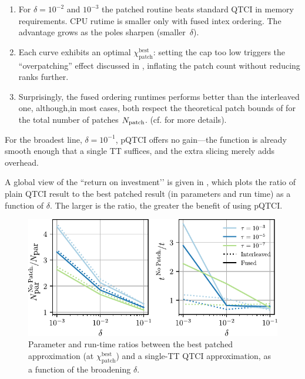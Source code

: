 \begin{enumerate}
\item For \(\delta=10^{-2}\) and \(10^{-3}\) the patched routine beats standard QTCI in memory requirements. CPU rutime is smaller only with fused intex ordering. The advantage grows as the poles sharpen (smaller~\(\delta\)).

\item Each curve exhibits an optimal
      \(\chi_{\text{patch}}^{\mathrm{best}}\): setting the cap too low triggers the ``overpatching'' effect discussed in
      , inflating the patch count without reducing ranks further.

\item Surprisingly, the fused ordering runtimes performs better than the interleaved one, although,in most cases, both respect the theoretical patch bounds of  for the total number of patches $N_{\text{patch}}$. (cf.  for more details).
\end{enumerate}

For the broadest line, \(\delta=10^{-1}\), pQTCI offers no gain—the function is already smooth enough that a single TT suffices, and the extra slicing merely adds overhead.

A global view of the “return on investment’’ is given in , which plots the ratio of plain QTCI result to the best patched result (in parameters and run time) as a function of \(\delta\).  The larger is the ratio, the greater the benefit of using pQTCI.

\begin{figure}[ht!]
    \centering
    \includegraphics{figures/localisationParam2DGreen.pdf}
    \caption{Parameter and run-time ratios between the best patched approximation (at \(\chi_{\text{patch}}^{\mathrm{best}}\)) and a single-TT QTCI
    approximation, as a function of the broadening \(\delta\).} 
    \label{fig:deltavsMemoryTime}
\end{figure}

